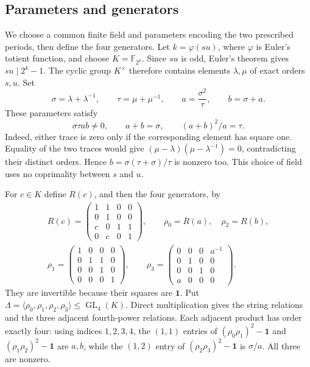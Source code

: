 \documentclass[11pt]{article}
\theoremstyle{definition}
\newcommand{\F}{\mathbb F}
\newcommand{\GL}{\operatorname{GL}}
\newcommand{\ang}[1]{\langle #1\rangle}
\begin{document}
\subsection{Parameters and generators}
We choose a common finite field and parameters encoding the two prescribed
periods, then define the four generators.
Let $k=\varphi(su)$, where $\varphi$ is Euler's totient function, and
choose $K=\F_{2^k}$. Since $su$ is odd, Euler's theorem gives
$su\mid2^k-1$. The cyclic group $K^\times$ therefore contains elements
$\lambda,\mu$ of exact orders $s,u$. Set
\begin{equation}\label{eq:parameters}
 \sigma=\lambda+\lambda^{-1},\qquad
 \tau=\mu+\mu^{-1},\qquad a=\frac{\sigma^2}{\tau},\qquad b=\sigma+a.
\end{equation}
These parameters satisfy
\begin{equation}\label{eq:nonzero}
       \sigma\tau ab\ne0,\qquad a+b=\sigma,\qquad (a+b)^2/a=\tau.
\end{equation}
Indeed, either trace is zero only if the corresponding element has
square one. Equality of the two traces would give
$(\mu-\lambda)(\mu-\lambda^{-1})=0$, contradicting their distinct
orders. Hence $b=\sigma(\tau+\sigma)/\tau$ is nonzero too.
This choice of field uses no coprimality between $s$ and $u$.

For $c\in K$ define $R(c)$, and then the four generators, by
\begin{equation}\label{eq:matrices}
\begin{gathered}
 R(c)=\begin{pmatrix}1&1&0&0\\0&1&0&0\\c&0&1&1\\0&c&0&1\end{pmatrix},
 \qquad \rho_0=R(a),\quad \rho_2=R(b),\\[3pt]
 \rho_1=\begin{pmatrix}1&0&0&0\\0&1&1&0\\0&0&1&0\\0&0&0&1\end{pmatrix},
 \qquad
 \rho_3=\begin{pmatrix}0&0&0&a^{-1}\\0&1&0&0\\0&0&1&0\\a&0&0&0\end{pmatrix}.
\end{gathered}
\end{equation}
They are invertible because their squares are $\mathbf 1$.
Put $\Lambda=\ang{\rho_0,\rho_1,\rho_2,\rho_3}\leq\GL_4(K)$.
Direct multiplication gives the string relations and the three adjacent
fourth-power relations. Each adjacent product has order exactly four:
using indices $1,2,3,4$, the $(1,1)$ entries of $(\rho_0\rho_1)^2-\mathbf 1$ and
$(\rho_1\rho_2)^2-\mathbf 1$ are $a,b$, while the $(1,2)$ entry of
$(\rho_2\rho_3)^2-\mathbf 1$ is $\sigma/a$. All three are nonzero.
\end{document}
